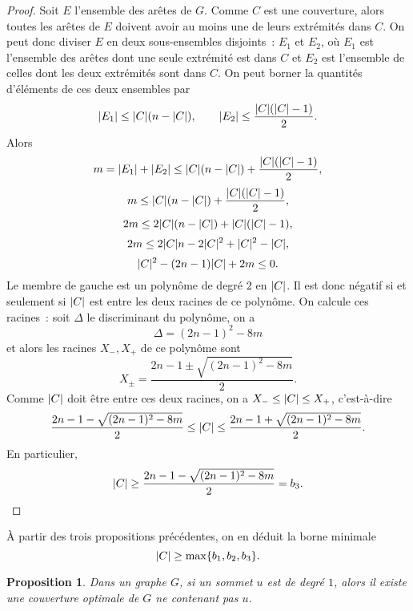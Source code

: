 \documentclass[a4paper,11pt]{amsart}
\theoremstyle{plain}
\newtheorem*{prop}{Proposition}
\DeclarePairedDelimiter{\abs}{\lvert}{\rvert}
\begin{document}
\begin{proof}
Soit $E$ l'ensemble des arêtes de $G$. Comme $C$ est une couverture, alors toutes les arêtes de $E$ doivent avoir au moins une de leurs extrémités dans $C$. On peut donc diviser $E$ en deux sous-ensembles disjoints~: $E_1$ et $E_2$, où $E_1$ est l'ensemble des arêtes dont une seule extrémité est dans $C$ et $E_2$ est l'ensemble de celles dont les deux extrémités sont dans $C$. On peut borner la quantités d'éléments de ces deux ensembles par
\[
\abs{E_1} \leq \abs{C} (n - \abs{C}), \qquad \abs{E_2} \leq \frac{\abs{C} (\abs{C} - 1)}{2}.
\]
Alors
\[
m = \abs{E_1} + \abs{E_2} \leq \abs{C} (n - \abs{C}) + \frac{\abs{C} (\abs{C} - 1)}{2},
\]
\[
m \leq \abs{C} (n - \abs{C}) + \frac{\abs{C} (\abs{C} - 1)}{2},
\]
\[
2m \leq 2\abs{C} (n - \abs{C}) + \abs{C} (\abs{C} - 1),
\]
\[
2m \leq 2\abs{C} n - 2\abs{C}^2 + \abs{C}^2 - \abs{C},
\]
\[
\abs{C}^2 - (2n-1) \abs{C} + 2m \leq 0.
\]
Le membre de gauche est un polynôme de degré $2$ en $\abs{C}$. Il est donc négatif si et seulement si $\abs{C}$ est entre les deux racines de ce polynôme. On calcule ces racines~: soit $\Delta$ le discriminant du polynôme, on a
\[
\Delta = (2n-1)^2 - 8m
\]
et alors les racines $X_-, X_+$ de ce polynôme sont
\[
X_{\pm} = \frac{2n - 1 \pm \sqrt{(2n-1)^2 - 8m}}{2}.
\]
Comme $\abs{C}$ doit être entre ces deux racines, on a $X_- \leq \abs{C} \leq X_+$, c'est-à-dire
\[
\frac{2n - 1 - \sqrt{(2n-1)^2 - 8m}}{2} \leq \abs{C} \leq \frac{2n - 1 + \sqrt{(2n-1)^2 - 8m}}{2}.
\]
En particulier,
\[
\abs{C} \geq \frac{2n - 1 - \sqrt{(2n-1)^2 - 8m}}{2} = b_3. \qedhere
\]
\end{proof}

À partir des trois propositions précédentes, on en déduit la borne minimale
\begin{equation}
\label{BorneMin}
\abs*{C} \geq \max\{b_1, b_2, b_3\}.
\end{equation}

\begin{prop}
Dans un graphe $G$, si un sommet $u$ est de degré $1$, alors il existe une couverture optimale de $G$ ne contenant pas $u$.
\end{prop}
\end{document}
